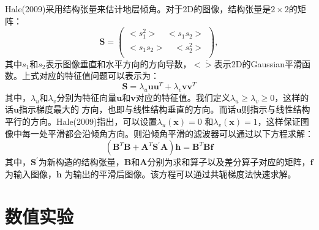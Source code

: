 Hale(2009)采用结构张量来估计地层倾角。对于2D的图像，结构张量是$2\times2$的矩阵：
\begin{equation}
        \mathbf{S}=
        \begin{pmatrix}
                < s^2_1 > \quad <s_1s_2 >\\
                < s_1s_2 > \quad < s^2_2 >\\
        \end{pmatrix},
        \label{eq:StructureTensor}
\end{equation}
其中$s_1$和$s_2$表示图像垂直和水平方向的方向导数，$<\dot>$表示2D的Gaussian平滑函数。上式对应的特征值问题可以表示为：
\begin{equation}
	\mathbf{S}=\lambda_u\mathbf{u}\mathbf{u}^T+\lambda_v\mathbf{v}\mathbf{v}^T
        \label{eq:EigenValueVector}
\end{equation}
其中，$\lambda_u$和$\lambda_v$分别为特征向量$\mathbf{u}$和$\mathbf{v}$对应的特征值。我们定义$\lambda_u\ge\lambda_v\ge0$，这样的话$\mathbf{u}$指示梯度最大的
方向，也即与线性结构垂直的方向。而话$\mathbf{u}$则指示与线性结构平行的方向。Hale(2009)指出，可以设置$\lambda_u(\mathbf{x})=0$
和$\lambda_v(\mathbf{x})=1$，这样保证图像中每一处平滑都会沿倾角方向。则沿倾角平滑的滤波器可以通过以下方程求解：
\begin{equation}
	(\mathbf{B}^T\mathbf{B}+\mathbf{A}^T\mathbf{S}^{\prime}\mathbf{A})\mathbf{h}=\mathbf{B}^T\mathbf{B}\mathbf{f}
        \label{eq:SparseMatrixSystem}
\end{equation}
其中，$\mathbf{S}^{\prime}$为新构造的结构张量，$\mathbf{B}$和$\mathbf{A}$分别为求和算子以及差分算子对应的矩阵，$\mathbf{f}$为输入图像，$\mathbf{h}$
为输出的平滑后图像。该方程可以通过共轭梯度法快速求解。

\section{数值实验}
